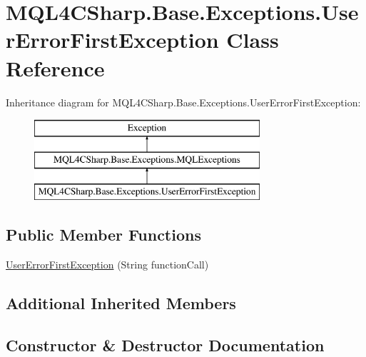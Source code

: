 \hypertarget{class_m_q_l4_c_sharp_1_1_base_1_1_exceptions_1_1_user_error_first_exception}{}\section{M\+Q\+L4\+C\+Sharp.\+Base.\+Exceptions.\+User\+Error\+First\+Exception Class Reference}
\label{class_m_q_l4_c_sharp_1_1_base_1_1_exceptions_1_1_user_error_first_exception}
Inheritance diagram for M\+Q\+L4\+C\+Sharp.\+Base.\+Exceptions.\+User\+Error\+First\+Exception\+:\begin{figure}[H]
\begin{center}
\leavevmode
\includegraphics[height=3.000000cm]{class_m_q_l4_c_sharp_1_1_base_1_1_exceptions_1_1_user_error_first_exception}
\end{center}
\end{figure}
\subsection*{Public Member Functions}
\begin{DoxyCompactItemize}
\item 
\hyperlink{class_m_q_l4_c_sharp_1_1_base_1_1_exceptions_1_1_user_error_first_exception_a39c3318591e5d8cbf71b1b6c32f2a22d}{User\+Error\+First\+Exception} (String function\+Call)
\end{DoxyCompactItemize}
\subsection*{Additional Inherited Members}


\subsection{Constructor \& Destructor Documentation}
